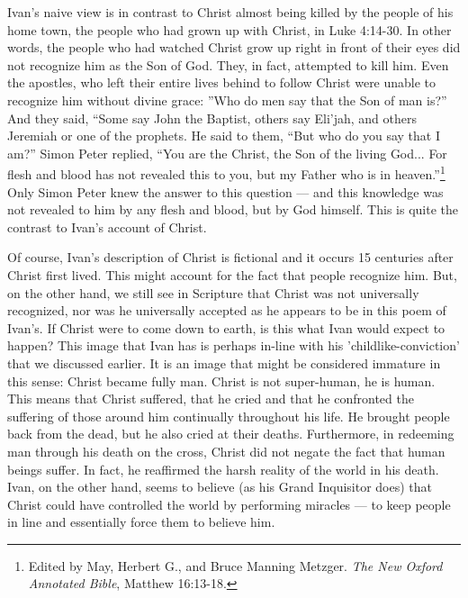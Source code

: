 Ivan's naive view is in contrast to Christ almost being killed by the people of his home town, the people who had grown up with Christ, in Luke 4:14-30. In other words, the people who had watched Christ grow up right in front of their eyes did not recognize him as the Son of God. They, in fact, attempted to kill him. Even the apostles, who left their entire lives behind to follow Christ were unable to recognize him without divine grace: ''Who do men say that the Son of man is?'' And they said, ``Some say John the Baptist, others say Eli'jah, and others Jeremiah or one of the prophets. He said to them, ``But who do you say that I am?'' Simon Peter replied, ``You are the Christ, the Son of the living God... For flesh and blood has not revealed this to you, but my Father who is in heaven.''\footnote{Edited by May, Herbert G., and Bruce Manning Metzger. \emph{The New Oxford Annotated Bible}, Matthew 16:13-18.} Only Simon Peter knew the answer to this question --- and this knowledge was not revealed to him by any flesh and blood, but by God himself. This is quite the contrast to Ivan's account of Christ.

Of course, Ivan's description of Christ is fictional and it occurs 15 centuries after Christ first lived. This might account for the fact that people recognize him. But, on the other hand, we still see in Scripture that Christ was not universally recognized, nor was he universally accepted as he appears to be in this poem of Ivan's. If Christ were to come down to earth, is this what Ivan would expect to happen? This image that Ivan has is perhaps in-line with his 'childlike-conviction' that we discussed earlier. It is an image that might be considered immature in this sense: Christ became fully man. Christ is not super-human, he is human. This means that Christ suffered, that he cried and that he confronted the suffering of those around him continually throughout his life. He brought people back from the dead, but he also cried at their deaths. Furthermore, in redeeming man through his death on the cross, Christ did not negate the fact that human beings suffer. In fact, he reaffirmed the harsh reality of the world in his death. Ivan, on the other hand, seems to believe (as his Grand Inquisitor does) that Christ could have controlled the world by performing miracles --- to keep people in line and essentially force them to believe him.

